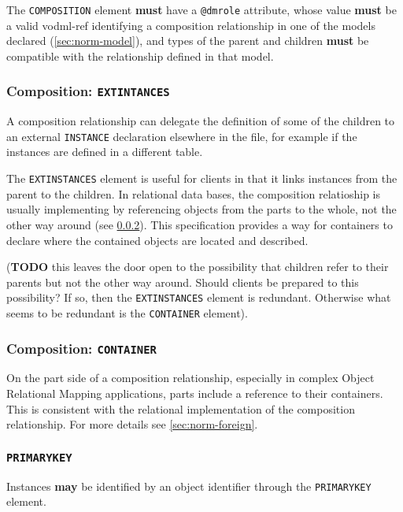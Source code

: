 \documentclass[11pt,a4paper]{ivoa}
\begin{document}
The \texttt{COMPOSITION} element \textbf{must} have a \texttt{@dmrole}
attribute, whose value \textbf{must} be a valid vodml-ref identifying a
composition relationship in one of the models declared
(\ref{sec:norm-model}), and types of the parent and children
\textbf{must} be compatible with the relationship defined in that model.

\subsubsection{Composition:
\texttt{EXTINTANCES}}\label{sec:norm-extinstances}

A composition relationship can delegate the definition of some of the
children to an external \texttt{INSTANCE} declaration elsewhere in the
file, for example if the instances are defined in a different table.

The \texttt{EXTINSTANCES} element is useful for clients in that it links
instances from the parent to the children. In relational data bases, the
composition relatioship is usually implementing by referencing objects
from the parts to the whole, not the other way around (see
\ref{sec:norm-container}). This specification provides a way for
containers to declare where the contained objects are located and
described.

(\textbf{TODO} this leaves the door open to the possibility that
children refer to their parents but not the other way around. Should
clients be prepared to this possibility? If so, then the
\texttt{EXTINSTANCES} element is redundant. Otherwise what seems to be
redundant is the \texttt{CONTAINER} element).

\subsubsection{Composition:
\texttt{CONTAINER}}\label{sec:norm-container}

On the part side of a composition relationship, especially in complex
Object Relational Mapping applications, parts include a reference to
their containers. This is consistent with the relational implementation
of the composition relationship. For more details see
\ref{sec:norm-foreign}.

\subsubsection{\texttt{PRIMARYKEY}}\label{sec:norm-primary}

Instances \textbf{may} be identified by an object identifier through the
\texttt{PRIMARYKEY} element.
\end{document}
